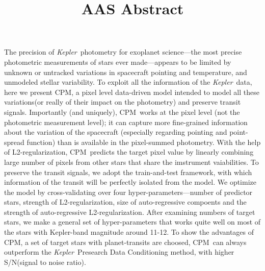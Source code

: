 \documentclass[12pt, preprint]{aastex}
\newcommand{\project}[1]{\textsl{#1}}
\newcommand{\Kepler}{\project{Kepler}}
\newcommand{\name}{CPM}
\begin{document}
\title{AAS Abstract}

The precision of \Kepler\ photometry for exoplanet science---the most
precise photometric measurements of stars ever made---appears to be
limited by unknown or untracked variations in spacecraft pointing and
temperature, and unmodeled stellar variability.
To exploit all the information of the \Kepler\ data, here we present \name, 
a pixel level data-driven model intended to model all these variations(or really of their impact on the photometry) and preserve transit signals.
Importantly (and uniquely),
  \name\ works at the pixel level (not the photometric measurement level);
  it can capture more fine-grained information about the variation of the spacecraft
  (especially regarding pointing and point-spread function)
  than is available in the pixel-summed photometry. 
With the help of L2-regularization, \name\ predicts the target pixel value by linearly combining large number of pixels from other stars that share the imstrument vaiabilities. 
To preserve the transit signals, we adopt the train-and-test framework, with which information of the transit will be perfectly isolated from the model. 
We optimize the model by cross-validating over four hyper-parameters---number of predictor stars, strength of L2-regularization, size of auto-regressive compoents and the strength of auto-regressive L2-regularization.
After examining numbers of target stars, we make a general set of hyper-parameters that works quite well on most of the stars with Kepler-band magnitude around 11-12. 
To show the advantages of \name,  a set of target stars with planet-transits are choosed, \name\ can always outperform the \Kepler\ Presearch Data Conditioning method,
with higher S/N(signal to noise ratio).
\end{document}
